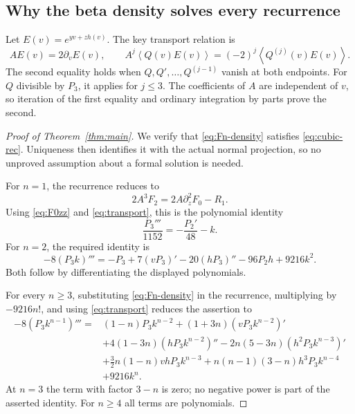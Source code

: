 \documentclass[11pt]{article}
\numberwithin{equation}{section}
\theoremstyle{definition}\newtheorem{definition}[theorem]{Definition}
\theoremstyle{remark}\newtheorem{remark}[theorem]{Remark}
\newcommand{\avg}[1]{\left\langle #1\right\rangle}
\begin{document}
\subsection{Why the beta density solves every recurrence}
Let $E(v)=e^{yv+zh(v)}$. The key transport relation is
\begin{equation}\label{eq:transport}
 A E(v)=2\partial_v E(v),\qquad
 A^j\avg{Q(v)E(v)}=(-2)^j\avg{Q^{(j)}(v)E(v)}.
\end{equation}
The second equality holds when $Q,Q',\ldots,Q^{(j-1)}$ vanish at
both endpoints. For $Q$ divisible by $P_3$, it applies for $j\le3$.
The coefficients of $A$ are independent of $v$, so iteration of the
first equality and ordinary integration by parts prove the second.

\begin{proof}[Proof of Theorem~\ref{thm:main}]
We verify that \eqref{eq:Fn-density} satisfies
\eqref{eq:cubic-rec}. Uniqueness then identifies it with the actual
normal projection, so no unproved assumption about a formal solution is
needed.

For $n=1$, the recurrence reduces to
\[
 2A^3F_2=2A\partial_z^2F_0-R_1.
\]
Using \eqref{eq:F0zz} and \eqref{eq:transport}, this is the polynomial
identity
\begin{equation}\label{eq:cubic-base1}
 \frac{P_3'''}{1152}=-\frac{P_2'}{48}-k.
\end{equation}
For $n=2$, the required identity is
\begin{equation}\label{eq:cubic-base2}
 -8(P_3k)'''=-P_3+7(vP_3)'-20(hP_3)''-96P_2h+9216k^2.
\end{equation}
Both follow by differentiating the displayed polynomials.

For every $n\ge3$, substituting \eqref{eq:Fn-density} in the
recurrence, multiplying by $-9216n!$, and using
\eqref{eq:transport} reduces the assertion to
\begin{equation}\label{eq:cubic-density-identity}
\begin{split}
 -8(P_3k^{n-1})'''={}&(1-n)P_3k^{n-2}
 +(1+3n)(vP_3k^{n-2})'\\
 &+4(1-3n)(hP_3k^{n-2})''
 -2n(5-3n)(h^2P_3k^{n-3})'\\
 &+\frac32n(1-n)vhP_3k^{n-3}
 +n(n-1)(3-n)h^3P_3k^{n-4}\!\\
 &+9216k^n.
\end{split}
\end{equation}
At $n=3$ the term with factor $3-n$ is zero; no negative power is
part of the asserted identity. For $n\ge4$ all terms are polynomials.


\end{proof}
\end{document}
